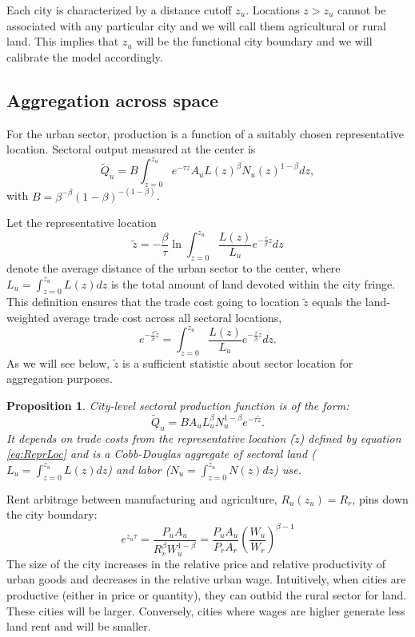 \documentclass[12pt]{article}
\newtheorem{proposition}{Proposition}
\begin{document}
Each city is characterized by a distance cutoff $z_u$. Locations $z>z_u$ cannot be associated with any particular city and we will call them agricultural or rural land. This implies that $z_u$ will be the functional city boundary and we will calibrate the model accordingly.

\subsection{Aggregation across space}
For the urban sector, production is a function of a suitably chosen representative location. Sectoral output measured at the center is
\begin{equation*}
\tilde{Q}_u=B\int_{z=0}^{z_u}e^{-\tau z}A_uL(z)^\beta N_u(z)^{1-\beta}dz,
\end{equation*}
with $B=\beta^{-\beta}(1-\beta)^{-(1-\beta)}$.

Let the representative location
\begin{equation}
\label{eq:ReprLoc}
\tilde z = -
\frac{\beta}{\tau}
\ln\int_{z=0}^{z_u} \frac{L(z)}{L_u}e^{-\frac{\tau}{\beta} z}dz
\end{equation}
denote the average distance of the urban sector to the center, where $L_u=\int_{z=0}^{z_u} L(z)dz$ is the total amount of land devoted within the city fringe. This definition ensures that the trade cost going to location $\tilde z$ equals the land-weighted average trade cost across all sectoral locations,
\[
e^{-\frac{\tau}{\beta} \tilde z} = \int_{z=0}^{z_u} \frac{L(z)}{L_u}e^{-\frac{\tau}{\beta} z}dz.
\]
As we will see below, $\tilde z$ is a sufficient statistic about sector location for aggregation purposes. 

\begin{proposition}\label{prop:aggregation}
City-level sectoral production function is of the form:
\begin{equation}
\tilde Q_u =
BA_uL_u^{\beta}N_u^{1-\beta}
 e^{-\tau\tilde z}.
\end{equation}
It depends on trade costs from the representative location ($\tilde{z}$) defined by equation \eqref{eq:ReprLoc} and is a Cobb-Douglas aggregate of sectoral land ($L_u=\int_{z=0}^{z_u}L(z)dz$) and labor ($N_u=\int_{z=0}^{z_u}N(z)dz$) use.
\end{proposition}

Rent arbitrage between manufacturing and agriculture, $R_u(z_{u}) = R_{r}$, pins down the city boundary:
\begin{equation}\label{eq:city_boundary}
e^{z_{u} \tau} =  
\frac {P_uA_u} {R_r^{\beta} W_u^{1-\beta}}
 =  
\frac {P_uA_u}{P_rA_r}
\left(
 \frac{W_u}{W_r}
\right)^{\beta-1}
\end{equation}
The size of the city increases in the relative price and relative productivity of urban goods and decreases in the relative urban wage. Intuitively, when cities are productive (either in price or quantity), they can outbid the rural sector for land. These cities will be larger. Conversely, cities where wages are higher generate less land rent and will be smaller.
\end{document}
